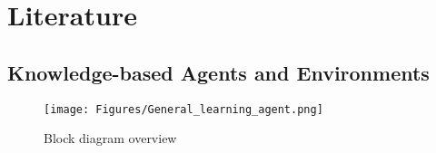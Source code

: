 \chapter{Literature} 
\label{chapter:Literature}





%


\section{Knowledge-based Agents and Environments}

\begin{figure}[H]
    \centering
    \texttt{[image: Figures/General\_learning\_agent.png]}
    \caption{Block diagram overview }
    \label{fig:sysdiag}
\end{figure}

